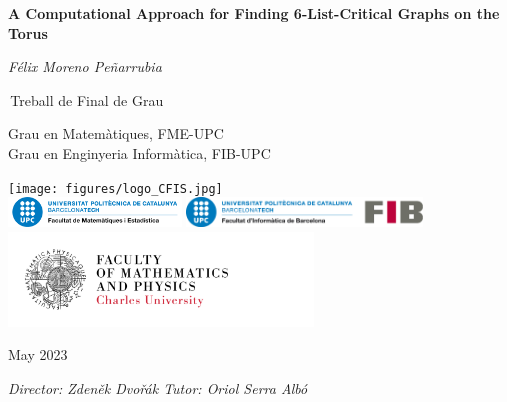 \documentclass{report}
\theoremstyle{definition}
\begin{document}
\begin{titlepage}
    \begin{center}
        \vspace*{1cm}
            
        \Huge
        \textbf{A Computational Approach for Finding 6-List-Critical Graphs on the Torus}
            
        \vspace{0.5cm}
        \Large
        \textit{Félix Moreno Peñarrubia}
            
        
            
        \,Treball de Final de Grau
            
        \vspace{0.8cm}
            
       
            
        \Large
        Grau en Matemàtiques, FME-UPC \\
        Grau en Enginyeria Informàtica, FIB-UPC \\
        \vspace{1.2cm}
        
        \texttt{[image: figures/logo\_CFIS.jpg]}
          \\
        \includegraphics[height=0.8cm]{figures/logo_FME_cropped.png}
        \includegraphics[height=0.8cm]{figures/logo_FIB.jpg}
        \\
        \includegraphics[height=2.5cm]{figures/logo_MFF.png}
        \vfill
        
      
        May 2023
        
		\vspace{2cm}
		\large        
        \textit{Director: Zdeněk Dvořák \hspace{3cm} Tutor: Oriol Serra Albó}
        
        
            
    \end{center}
\end{titlepage}
\end{document}

